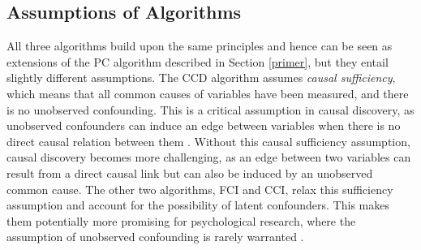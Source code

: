 \documentclass[twoside, 11pt]{article}
\begin{document}



\subsection{Assumptions of Algorithms}
All three algorithms build upon the same principles and hence can be seen as extensions of the PC algorithm described in Section \ref{primer}, but they entail slightly different assumptions. The CCD algorithm assumes \textit{causal sufficiency}, which means that all common causes of variables have been measured, and there is no unobserved confounding. This is a critical assumption in causal discovery, as unobserved confounders can induce an edge between variables when there is no direct causal relation between them \citep{lauritzen1996graphical, spirtes_causal_2013}.
Without this causal sufficiency assumption, causal discovery becomes more challenging, as an edge between two variables can result from a direct causal link but can also be induced by an unobserved common cause. 
The other two algorithms, FCI and CCI, relax this sufficiency assumption and account for the possibility of latent confounders. This makes them potentially more promising for psychological research, where the assumption of unobserved confounding is rarely warranted \citep{rohrer_thinking_2018}. 
\end{document}
